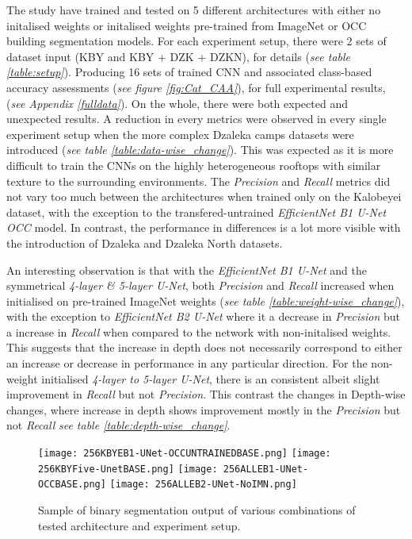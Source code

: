 \documentclass[11pt, a4paper, twoside]{report}
\begin{document}
The study have trained and tested on 5 different architectures with either no initalised weights or initalised weights pre-trained from ImageNet or OCC building segmentation models. For each experiment setup, there were 2 sets of dataset input (KBY and KBY + DZK + DZKN), for details (\textit{see table \ref{table:setup}}). Producing 16 sets of trained CNN and associated class-based accuracy assessments (\textit{see figure \ref{fig:Cat_CAA}}), for full experimental results, (\textit{see Appendix \ref{fulldata}}). On the whole, there were both expected and unexpected results. A reduction in every metrics were observed in every single experiment setup when the more complex Dzaleka camps datasets were introduced (\textit{see table \ref{table:data-wise_change}}). This was expected as it is more difficult to train the CNNs on the highly heterogeneous rooftops with similar texture to the surrounding environments. The \textit{Precision} and \textit{Recall} metrics did not vary too much between the architectures when trained only on the Kalobeyei dataset, with the exception to the transfered-untrained \textit{EfficientNet B1 U-Net OCC} model. In contrast, the performance in differences is a lot more visible with the introduction of Dzaleka and Dzaleka North datasets.\\\par

An interesting observation is that with the \textit{EfficientNet B1 U-Net} and the symmetrical \textit{4-layer \& 5-layer U-Net}, both \textit{Precision} and \textit{Recall} increased when initialised on pre-trained ImageNet weights (\textit{see table \ref{table:weight-wise_change}}), with the exception to \textit{EfficientNet B2 U-Net} where it a decrease in \textit{Precision} but a increase in \textit{Recall} when compared to the network with non-initalised weights. This suggests that the increase in depth does not necessarily correspond to either an increase or decrease in performance in any particular direction. For the non-weight initialised \textit{4-layer to 5-layer U-Net}, there is an consistent albeit slight improvement in \textit{Recall} but not \textit{Precision}. This contrast the changes in Depth-wise changes, where increase in depth shows improvement mostly in the \textit{Precision} but not \textit{Recall} \textit{see table \ref{table:depth-wise_change}}.\\\par

\begin{figure}[H]
  \centering
  \texttt{[image: 256KBYEB1-UNet-OCCUNTRAINEDBASE.png]}
  \texttt{[image: 256KBYFive-UnetBASE.png]}
  \texttt{[image: 256ALLEB1-UNet-OCCBASE.png]}
  \texttt{[image: 256ALLEB2-UNet-NoIMN.png]}
  \caption{Sample of binary segmentation output of various combinations of tested architecture and experiment setup.}
  \label{fig:output}
\end{figure}
\end{document}
